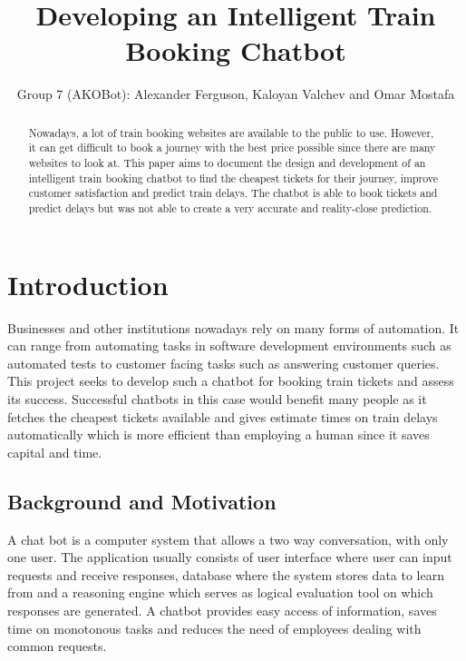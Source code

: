 \documentclass[11pt]{article}
\title{Developing an Intelligent Train Booking Chatbot}
\author{Group 7 (AKOBot): Alexander Ferguson, Kaloyan Valchev and Omar Mostafa}
\begin{document}
\maketitle

\begin{abstract}
    
    Nowadays, a lot of train booking websites are available to the public to use. However, it can get difficult to book a journey with the best price possible since there are many websites to look at. This paper aims to document the design and development of an intelligent train booking chatbot to find the cheapest tickets for their journey, improve customer satisfaction and predict train delays. The chatbot is able to book tickets and predict delays but was not able to create a very accurate and reality-close prediction. 

\end{abstract}

\tableofcontents

\section{Introduction}
Businesses and other institutions nowadays rely on many forms of automation. It can range from automating tasks in software development environments such as automated tests to customer facing tasks such as answering customer queries. This project seeks to develop such a chatbot for booking train tickets and assess its success. Successful chatbots in this case would benefit many people as it fetches the cheapest tickets available and gives estimate times on train delays automatically which is more efficient than employing a human since it saves capital and time.



    \subsection{Background and Motivation}
    A chat bot is a computer system that allows a two way conversation, with only one user. The application usually consists of user interface where user can input requests and receive responses, database where the system stores data to learn from and a reasoning engine which serves as logical evaluation tool on which responses are generated. A chatbot provides easy access of information, saves time on monotonous tasks and reduces the need of employees dealing with common requests.
\end{document}
